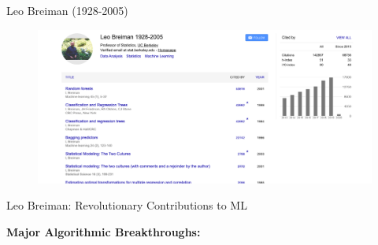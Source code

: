 \documentclass[usenames,dvipsnames]{beamer}
\begin{document}
\begin{frame}{Leo Breiman (1928-2005)}
\begin{center}
\begin{figure}
	\centering
	\includegraphics[width=1.1\linewidth]{../assets/decision-trees/diagrams/brieman}
	\label{fig:brieman}
\end{figure}
\end{center}
\end{frame}

\begin{frame}{Leo Breiman: Revolutionary Contributions to ML}
\begin{keypointsbox}
\textbf{Major Algorithmic Breakthroughs:}
\end{keypointsbox}
\end{frame}
\end{document}
